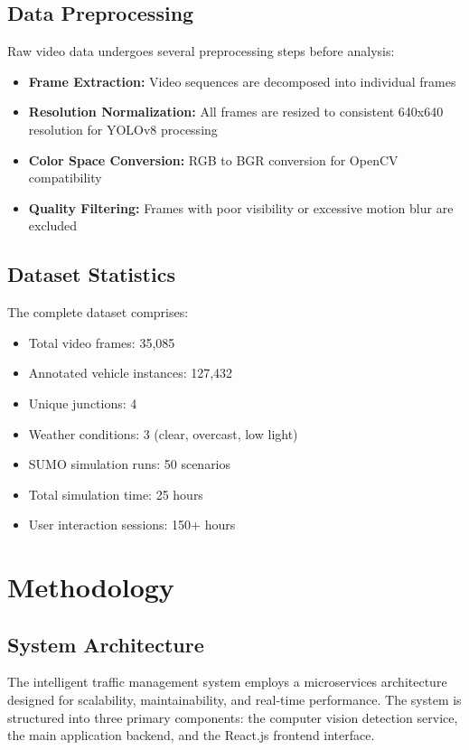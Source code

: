 \documentclass[conference]{IEEEtran}
\begin{document}
\subsection{Data Preprocessing}

Raw video data undergoes several preprocessing steps before analysis:

\begin{itemize}
\item \textbf{Frame Extraction:} Video sequences are decomposed into individual frames
\item \textbf{Resolution Normalization:} All frames are resized to consistent 640x640 resolution for YOLOv8 processing
\item \textbf{Color Space Conversion:} RGB to BGR conversion for OpenCV compatibility
\item \textbf{Quality Filtering:} Frames with poor visibility or excessive motion blur are excluded
\end{itemize}

\subsection{Dataset Statistics}

The complete dataset comprises:
\begin{itemize}
\item Total video frames: 35,085
\item Annotated vehicle instances: 127,432
\item Unique junctions: 4
\item Weather conditions: 3 (clear, overcast, low light)
\item SUMO simulation runs: 50 scenarios
\item Total simulation time: 25 hours
\item User interaction sessions: 150+ hours
\end{itemize}

\section{Methodology}

\subsection{System Architecture}

The intelligent traffic management system employs a microservices architecture designed for scalability, maintainability, and real-time performance. The system is structured into three primary components: the computer vision detection service, the main application backend, and the React.js frontend interface.
\end{document}
